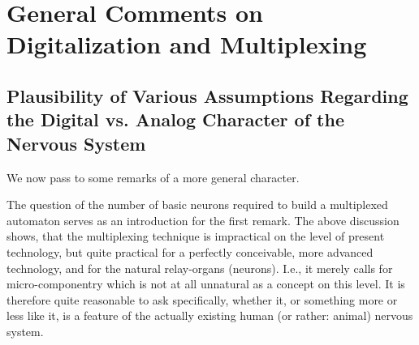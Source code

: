 \documentclass[twocolumn,preprintnumbers,amsmath,amssymb,floatfix]{revtex4}
\begin{document}
\section{\label{sec:eleven}General Comments on Digitalization and Multiplexing}

\subsection{\label{sec:eleven1}Plausibility of Various Assumptions Regarding the Digital vs. Analog Character of the Nervous System}

We now pass to some remarks of a more general character.

The question of the number of basic neurons required to build a
multiplexed automaton serves as an introduction for the first
remark. The above discussion shows, that the multiplexing
technique is impractical on the level of present technology, but
quite practical for a perfectly conceivable, more advanced
technology, and for the natural relay-organs (neurons). I.e., it
merely calls for micro-componentry which is not at all unnatural
as a concept on this level. It is therefore quite reasonable to
ask specifically, whether it, or something more or less like it,
is a feature of the actually existing human (or rather: animal)
nervous system.
\end{document}
